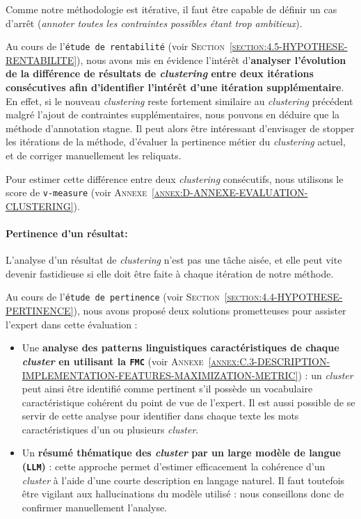 			Comme notre méthodologie est itérative, il faut être capable de définir un cas d'arrêt (\textit{annoter toutes les contraintes possibles étant trop ambitieux}).
			
			Au cours de l'\texttt{étude de rentabilité} (voir \textsc{Section~\ref{section:4.5-HYPOTHESE-RENTABILITE}}), nous avons mis en évidence l'intérêt d'\textbf{analyser l'évolution de la différence de résultats de \textit{clustering} entre deux itérations consécutives afin d'identifier l'intérêt d'une itération supplémentaire}.
			En effet, si le nouveau \textit{clustering} reste fortement similaire au \textit{clustering} précédent malgré l'ajout de contraintes supplémentaires, nous pouvons en déduire que la méthode d'annotation stagne.
			Il peut alors être intéressant d'envisager de stopper les itérations de la méthode, d'évaluer la pertinence métier du \textit{clustering} actuel, et de corriger manuellement les reliquats.
			
			Pour estimer cette différence entre deux \textit{clustering} consécutifs, nous utilisons le score de \texttt{v-measure} (voir \textsc{Annexe~\ref{annex:D-ANNEXE-EVALUATION-CLUSTERING}}).
		
		
		\paragraph{\textcolor{colorSilverLakeBlue}{\faCheckSquare} Pertinence d'un résultat:}
			
			L'analyse d'un résultat de \textit{clustering} n'est pas une tâche aisée, et elle peut vite devenir fastidieuse si elle doit être faite à chaque itération de notre méthode.
			
			Au cours de l'\texttt{étude de pertinence} (voir \textsc{Section~\ref{section:4.4-HYPOTHESE-PERTINENCE}}), nous avons proposé deux solutions prometteuses pour assister l'expert dans cette évaluation :
			\begin{itemize}
				\item Une \textbf{analyse des patterns linguistiques caractéristiques de chaque \textit{cluster} en utilisant la \texttt{FMC}} (voir \textsc{Annexe~\ref{annex:C.3-DESCRIPTION-IMPLEMENTATION-FEATURES-MAXIMIZATION-METRIC}}) :
				un \textit{cluster} peut ainsi être identifié comme pertinent s'il possède un vocabulaire caractéristique cohérent du point de vue de l'expert.
				Il est aussi possible de se servir de cette analyse pour identifier dans chaque texte les mots caractéristiques d'un ou plusieurs \textit{cluster}.
				\item Un \textbf{résumé thématique des \textit{cluster} par un large modèle de langue (\texttt{LLM})} :
				cette approche permet d'estimer efficacement la cohérence d'un \textit{cluster} à l'aide d'une courte description en langage naturel.
				Il faut toutefois être vigilant aux hallucinations du modèle utilisé : nous conseillons donc de confirmer manuellement l'analyse.
			\end{itemize}
			
